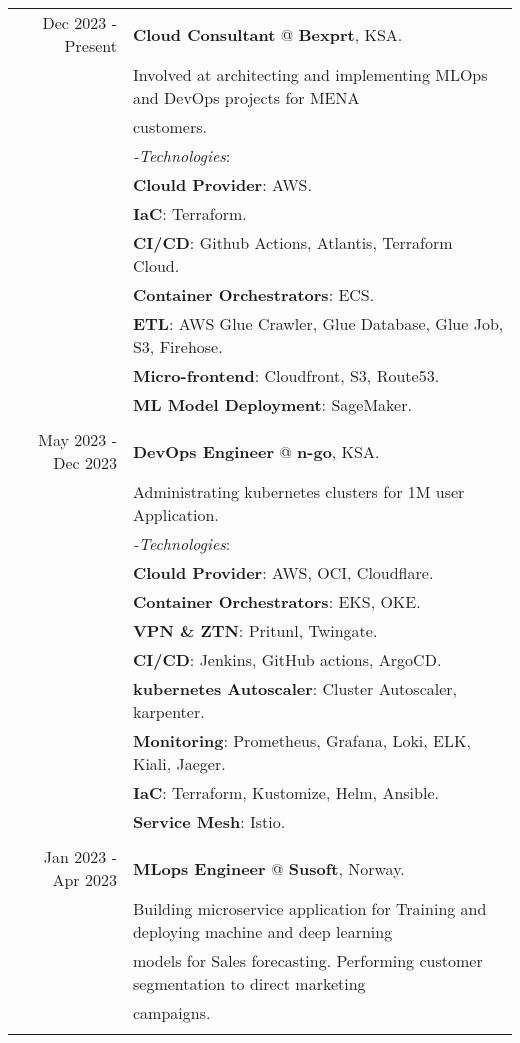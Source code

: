 \documentclass[a4paper,10pt]{article}
\begin{document}
\begin{tabular}{r|l}
    Dec 2023 - Present& \textbf{Cloud Consultant} @
    \textbf{Bexprt}, KSA. \\&
    Involved at architecting and implementing MLOps and DevOps projects for MENA \\& customers. \\&
    \textit{-Technologies}:\\&
    \textbf{Clould Provider}: AWS. \\&
    \textbf{IaC}: Terraform. \\&
    \textbf{CI/CD}: Github Actions, Atlantis, Terraform Cloud. \\&
    \textbf{Container Orchestrators}: ECS. \\&
    \textbf{ETL}: AWS Glue Crawler, Glue Database, Glue Job, S3, Firehose. \\&
    \textbf{Micro-frontend}: Cloudfront, S3, Route53. \\&
    \textbf{ML Model Deployment}: SageMaker. \\&
    \\
    May 2023 - Dec 2023 & \textbf{DevOps Engineer} @
    \textbf{n-go}, KSA. \\&
    Administrating kubernetes clusters for 1M user Application. \\&
    \textit{-Technologies}:\\&
    \textbf{Clould Provider}: AWS, OCI, Cloudflare. \\&
    \textbf{Container Orchestrators}: EKS, OKE. \\&
    \textbf{VPN \& ZTN}: Pritunl, Twingate. \\&
    \textbf{CI/CD}: Jenkins, GitHub actions, ArgoCD. \\&
    \textbf{kubernetes Autoscaler}: Cluster Autoscaler, karpenter. \\&
    \textbf{Monitoring}: Prometheus, Grafana, Loki, ELK, Kiali, Jaeger. \\&
    \textbf{IaC}: Terraform, Kustomize, Helm, Ansible.\\&
    \textbf{Service Mesh}: Istio. \\&
    \\
    Jan 2023 - Apr 2023 & \textbf{MLops Engineer} @
    \textbf{Susoft}, Norway. \\& 
    Building microservice application for Training and deploying machine and deep learning \\& models for Sales forecasting. 
    Performing customer segmentation to direct marketing \\& campaigns. \\&

\end{tabular}
\end{document}
